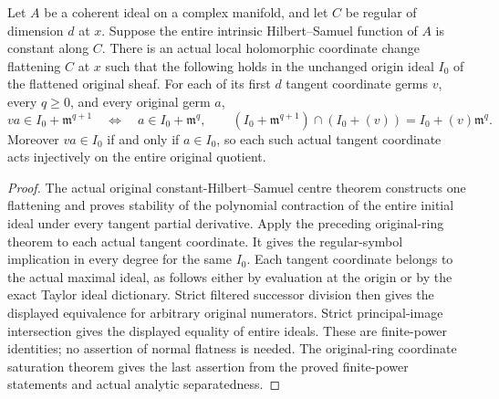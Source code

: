 \begin{theorem}
\label{hir:actual-original-hs-centre-tangent-strict-division}
\leanok
Let $A$ be a coherent ideal on a complex manifold, and let $C$ be
regular of dimension $d$ at $x$. Suppose the entire intrinsic
Hilbert--Samuel function of $A$ is constant along $C$. There is an
actual local holomorphic coordinate change flattening $C$ at $x$
such that the following holds in the unchanged origin ideal $I_0$
of the flattened original sheaf. For each of its first $d$ tangent
coordinate germs $v$, every $q\geq0$, and every original germ $a$,
\[
 va\in I_0+\mathfrak m^{q+1}
 \quad\Longleftrightarrow\quad a\in I_0+\mathfrak m^q,
 \qquad
 (I_0+\mathfrak m^{q+1})\cap(I_0+(v))
   =I_0+(v)\mathfrak m^q.
\]
Moreover $va\in I_0$ if and only if $a\in I_0$, so each such actual
tangent coordinate acts injectively on the entire original quotient.
\end{theorem}
\begin{proof}
The actual original constant-Hilbert--Samuel centre theorem constructs
one flattening and proves stability of the polynomial contraction of
the entire initial ideal under every tangent partial derivative.
Apply the preceding original-ring theorem to each actual tangent
coordinate. It gives the regular-symbol implication in every degree
for the same $I_0$. Each tangent coordinate belongs to the actual
maximal ideal, as follows either by evaluation at the origin or by
the exact Taylor ideal dictionary. Strict filtered successor division
then gives the displayed equivalence for arbitrary original
numerators. Strict principal-image intersection gives the displayed
equality of entire ideals. These are finite-power identities; no
assertion of normal flatness is needed. The original-ring coordinate
saturation theorem gives the last assertion from the proved
finite-power statements and actual analytic separatedness.
\end{proof}
